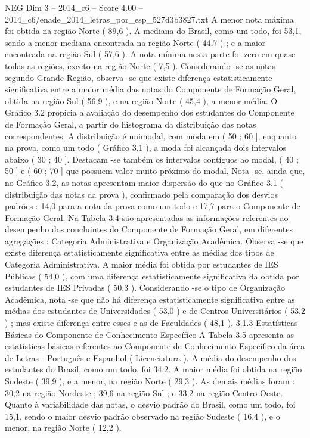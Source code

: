 \begin{textsample}{NEG Dim 3 – 2014\_c6 – Score 4.00 – 2014\_c6/enade\_2014\_letras\_por\_esp\_527d3b3827.txt}
A menor nota máxima foi obtida na região Norte ( 89,6 ).
A mediana do Brasil, como um todo, foi 53,1, sendo a menor mediana encontrada na região Norte ( 44,7 ) ; e a maior encontrada na região Sul ( 57,6 ).
A nota mínima nesta parte foi zero em quase todas as regiões, exceto na região Norte ( 7,5 ).
Considerando -se as notas segundo Grande Região, observa -se que existe diferença estatisticamente significativa entre a maior média das notas do Componente de Formação Geral, obtida na região Sul ( 56,9 ), e na região Norte ( 45,4 ), a menor média.
O Gráfico 3.2 propicia a avaliação do desempenho dos estudantes do Componente de Formação Geral, a partir do histograma da distribuição das notas correspondentes.
A distribuição é unimodal, com moda em ( 50 ; 60 ], enquanto na prova, como um todo ( Gráfico 3.1 ), a moda foi alcançada dois intervalos abaixo ( 30 ; 40 ].
Destacam -se também os intervalos contíguos ao modal, ( 40 ; 50 ] e ( 60 ; 70 ] que possuem valor muito próximo do modal.
Nota -se, ainda que, no Gráfico 3.2, as notas apresentam maior dispersão do que no Gráfico 3.1 ( distribuição das notas da prova ), confirmado pela comparação dos desvios padrões : 14,0 para a nota da prova como um todo e 17,7 para o Componente de Formação Geral.
Na Tabela 3.4 são apresentadas as informações referentes ao desempenho dos concluintes do Componente de Formação Geral, em diferentes agregações : Categoria Administrativa e Organização Acadêmica.
Observa -se que existe diferença estatisticamente significativa entre as médias dos tipos de Categoria Administrativa.
A maior média foi obtida por estudantes de IES Públicas ( 54,0 ), com uma diferença estatisticamente significativa da obtida por estudantes de IES Privadas ( 50,3 ).
Considerando -se o tipo de Organização Acadêmica, nota -se que não há diferença estatisticamente significativa entre as médias dos estudantes de Universidades ( 53,0 ) e de Centros Universitários ( 53,2 ) ; mas existe diferença entre esses e as de Faculdades ( 48,1 ). 3.1.3 Estatísticas Básicas do Componente de Conhecimento Específico A Tabela 3.5 apresenta as estatísticas básicas referentes ao Componente de Conhecimento Específico da área de Letras - Português e Espanhol ( Licenciatura ).
A média do desempenho dos estudantes do Brasil, como um todo, foi 34,2.
A maior média foi obtida na região Sudeste ( 39,9 ), e a menor, na região Norte ( 29,3 ).
As demais médias foram : 30,2 na região Nordeste ; 39,6 na região Sul ; e 33,2 na região Centro-Oeste.
Quanto à variabilidade das notas, o desvio padrão do Brasil, como um todo, foi 15,1, sendo o maior desvio padrão observado na região Sudeste ( 16,4 ), e o menor, na região Norte ( 12,2 ).

\end{textsample}
